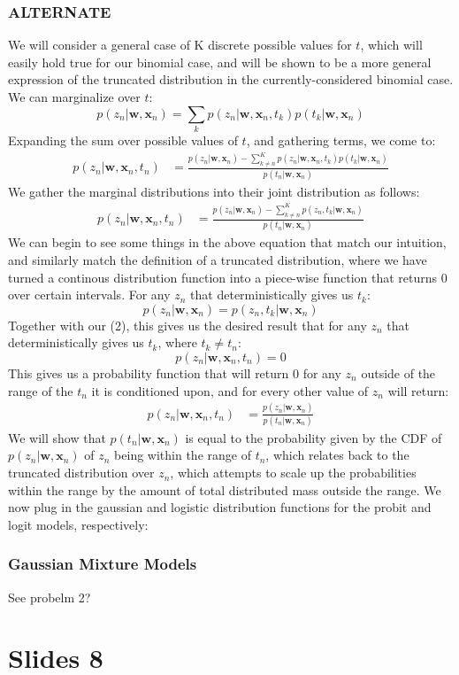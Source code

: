 \documentclass[a4paper,12pt]{article}
\begin{document}
\subsubsection*{ALTERNATE}
%
We will consider a general case of K discrete possible values for $t$, which will easily hold true for our binomial case, and will be shown to be a more general expression of the truncated distribution in the currently-considered binomial case. We can marginalize over $t$:
%
$$
p(z_n | \bm{w}, \bm{x}_n) = \sum_k p(z_n | \bm{w}, \bm{x}_n, t_k)p(t_k | \bm{w}, \bm{x}_n)
$$
%
Expanding the sum over possible values of $t$, and gathering terms, we come to:
%
\begin{align*}
p(z_n | \bm{w}, \bm{x}_n, t_n) &= \frac{p(z_n | \bm{w}, \bm{x}_n) - \sum_{k \neq n}^K p(z_n | \bm{w}, \bm{x}_n, t_k)p(t_k | \bm{w}, \bm{x}_n)}{p(t_n | \bm{w}, \bm{x}_n)}
\end{align*}
%
We gather the marginal distributions into their joint distribution as follows:
%
\begin{align}
p(z_n | \bm{w}, \bm{x}_n, t_n) &= \frac{p(z_n | \bm{w}, \bm{x}_n) - \sum_{k \neq n}^K p(z_n, t_k | \bm{w}, \bm{x}_n)}{p(t_n | \bm{w}, \bm{x}_n)}
\end{align}
%
We can begin to see some things in the above equation that match our intuition, and similarly match the definition of a truncated distribution, where we have turned a continous distribution function into a piece-wise function that returns 0 over certain intervals. For any $z_n$ that deterministically gives us $t_k$:
%
$$
p(z_n | \bm{w}, \bm{x}_n) = p(z_n, t_k | \bm{w}, \bm{x}_n)
$$
%
Together with our (2), this gives us the desired result that for any $z_n$ that deterministically gives us $t_k$, where $t_k \neq t_n$:
%
$$
p(z_n | \bm{w}, \bm{x}_n, t_n) = 0
$$
%
This gives us a probability function that will return 0 for any $z_n$ outside of the range of the $t_n$ it is conditioned upon, and for every other value of $z_n$ will return:
%
\begin{align}
p(z_n | \bm{w}, \bm{x}_n, t_n) &= \frac{p(z_n | \bm{w}, \bm{x}_n)}{p(t_n | \bm{w}, \bm{x}_n)}
\end{align}
%
We will show that $p(t_n | \bm{w}, \bm{x}_n)$ is equal to the probability given by the CDF of $p(z_n | \bm{w}, \bm{x}_n)$ of $z_n$ being within the range of $t_n$, which relates back to the truncated distribution over $z_n$, which attempts to scale up the probabilities within the range by the amount of total distributed mass outside the range. We now plug in the gaussian and logistic distribution functions for the probit and logit models, respectively:



\subsubsection*{Gaussian Mixture Models}

See probelm 2?

\section*{Slides 8}

\subsection*{}
\end{document}

